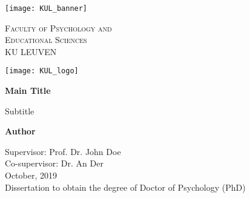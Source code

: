 \begin{titlepage}
    \begin{center}
     
       \texttt{[image: KUL\_banner]}%
       
       \vspace*{0.5cm}

        \textsc{Faculty of Psychology and}\\
        \textsc{Educational Sciences}\\ 
        KU LEUVEN\\
        
         \vspace*{0.7cm}

		\texttt{[image: KUL\_logo]}
		
		 \vspace*{0.5cm}

 
        \Huge
        \textbf{Main Title}
 
        \vspace{0.5cm}
        \LARGE
        Subtitle
 
        \vspace{1.5cm}
 
        \textbf{Author}
 
        \vfill
 
        \vspace{0.8cm}
  
        \Large
        Supervisor: Prof. Dr. John Doe\\
        Co-supervisor: Dr. An Der\\[1\baselineskip]
      
        October, 2019\\[2\baselineskip]
        
                
        \large
        Dissertation to obtain the degree of Doctor of Psychology (PhD)\\
 
    \end{center}
\end{titlepage}
